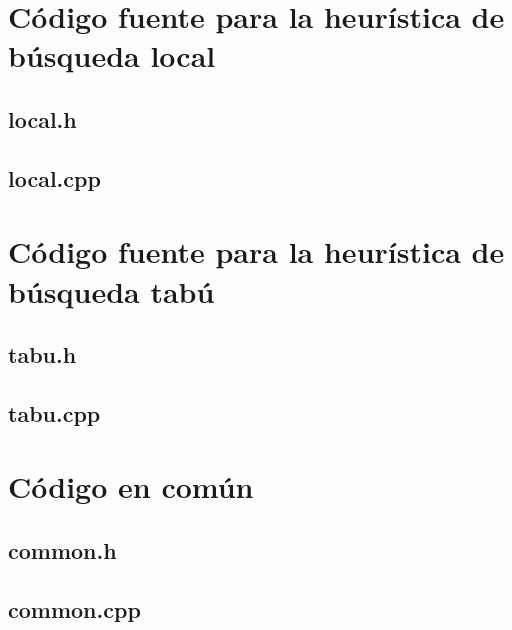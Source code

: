 \documentclass[a4paper, 10pt, twoside]{article}
\begin{document}
\newpage

\section{Código fuente para la heurística de búsqueda local}


\subsection{local.h}




\subsection{local.cpp}






\newpage

\section{Código fuente para la heurística de búsqueda tabú}


\subsection{tabu.h}




\subsection{tabu.cpp}






\newpage

\section{Código en común}


\subsection{common.h}




\subsection{common.cpp}




\end{document}
